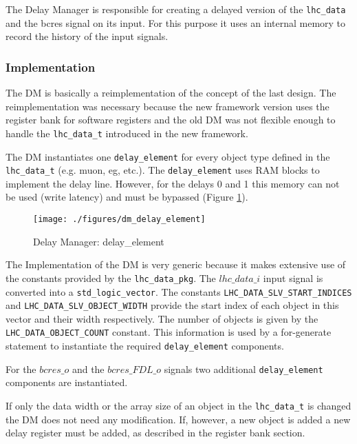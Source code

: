 The Delay Manager is responsible for creating a delayed version of the \texttt{lhc\_data} and the bcres signal on its input.
For this purpose it uses an internal memory to record the history of the input signals.

\subsubsection{Implementation}\label{sec:dm-impl}
The DM is basically a reimplementation of the concept of the last design. The reimplementation was necessary because the new framework version uses the register bank for
software registers and the old DM was not flexible enough to handle the \texttt{lhc\_data\_t} introduced in the new framework.

The DM instantiates one \texttt{delay\_element} for every object type defined in the \texttt{lhc\_data\_t} (e.g. muon, eg, etc.). The \texttt{delay\_element} uses RAM blocks
to implement the delay line. However, for the delays 0 and 1 this memory can not be used (write latency) and must be bypassed (Figure \ref{fig_dm_delay_element}).

\begin{figure}[h]
\begin{center}
\texttt{[image: ./figures/dm\_delay\_element]}
\end{center}
\caption{Delay Manager: delay\_element}
\label{fig_dm_delay_element}
\end{figure}

The Implementation of the DM is very generic because it makes extensive use of the constants provided by the \texttt{lhc\_data\_pkg}. The $lhc\_data\_i$ input signal
is converted into a \texttt{std\_logic\_vector}.
The constants \texttt{LHC\_DATA\_SLV\_START\_INDICES} and \texttt{LHC\_DATA\_SLV\_OBJECT\_WIDTH} provide the start index of each object in this vector and their
width respectively. The number of objects is given by the \texttt{LHC\_DATA\_OBJECT\_COUNT} constant. This information is used by a for-generate statement to instantiate
the required \texttt{delay\_element} components.

For the $bcres\_o$ and the $bcres\_FDL\_o$ signals two additional \texttt{delay\_element} components are instantiated.

If only the data width or the array size of an object in the \texttt{lhc\_data\_t} is changed the DM does not need any modification. If, however, a new object is added a
new delay register must be added, as described in the register bank section.

